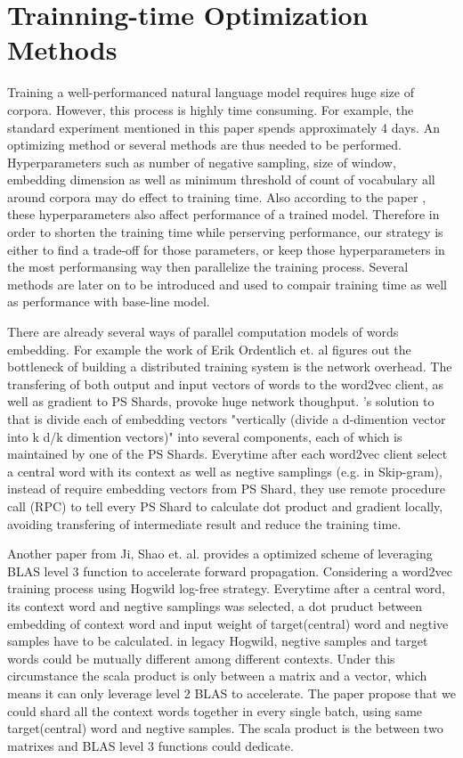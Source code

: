 \documentclass[11pt,a4paper]{article}
\begin{document}
\section{Trainning-time Optimization Methods}
Training a well-performanced natural language model requires huge size of corpora. However, this process is highly time consuming. For example, the standard experiment mentioned in this paper spends approximately 4 days. An optimizing method or several methods are thus needed to be performed. Hyperparameters such as number of negative sampling, size of window, embedding dimension as well as minimum threshold of count of vocabulary all around corpora may do effect to training time. Also according to the paper \cite{levy2015improving}, these hyperparameters also affect performance of a trained model. Therefore in order to shorten the training time while perserving performance, our strategy is either to find a trade-off for those parameters, or keep those hyperparameters in the most performansing way then parallelize the training process. Several methods are later on to be introduced and used to compair training time as well as performance with base-line model.

There are already several ways of parallel computation models of words embedding. For example the work of Erik Ordentlich et. al \cite{ordentlich2016network} figures out the bottleneck of building a distributed training system is the network overhead. The transfering of both output and input vectors of words to the word2vec client, as well as gradient to PS Shards, provoke huge network thoughput. \citep{Ordentlich}'s solution to that is divide each of embedding vectors "vertically (divide a d-dimention vector into k d/k dimention vectors)" into several components, each of which is maintained by one of the PS Shards. Everytime after each word2vec client select a central word with its context as well as negtive samplings (e.g. in Skip-gram), instead of require embedding vectors from PS Shard, they use remote procedure call (RPC) to tell every PS Shard to calculate dot product and gradient locally, avoiding transfering of intermediate result and reduce the training time.

Another paper from Ji, Shao et. al. \cite{ji2016parallelizing} provides a optimized scheme of leveraging BLAS level 3 function to accelerate forward propagation. Considering a word2vec training process using Hogwild \cite{recht2011hogwild} log-free strategy. Everytime after a central word, its context word and negtive samplings was selected, a dot pruduct between embedding of context word and input weight of target(central) word and negtive samples have to be calculated. in legacy Hogwild, negtive samples and target words could be mutually different among different contexts. Under this circumstance the scala product is only between a matrix and a vector, which means it can only leverage level 2 BLAS to accelerate. The paper propose that we could shard all the context words together in every single batch, using same target(central) word and negtive samples. The scala product is the between two matrixes and BLAS level 3 functions could dedicate.
\end{document}
